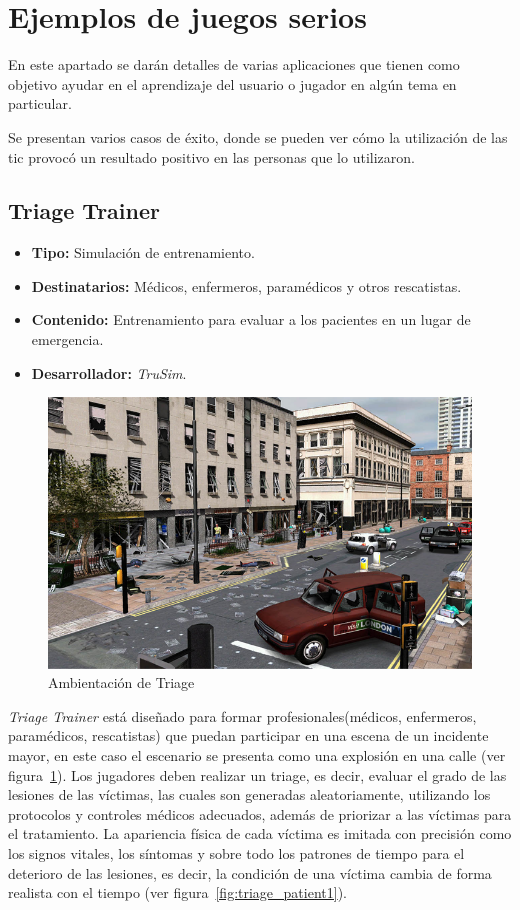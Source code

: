 \section{Ejemplos de juegos serios}

En este apartado se darán detalles de varias aplicaciones que
tienen como objetivo ayudar en el aprendizaje del usuario o jugador en algún
tema en particular.

Se presentan varios casos de éxito, donde se pueden ver cómo la utilización de
las \Gls{tic} provocó un resultado positivo en las personas que lo
utilizaron.

\subsection{Triage Trainer}

\begin{itemize}
\item \textbf{Tipo:} Simulación de entrenamiento.
\item \textbf{Destinatarios:} Médicos, enfermeros, paramédicos y otros
    rescatistas.
\item \textbf{Contenido:} Entrenamiento para evaluar a los pacientes en un lugar de
  emergencia.
\item \textbf{Desarrollador:} \emph{TruSim}.
\end{itemize}

\begin{figure}[ht!] 
\centering 
\includegraphics[scale=0.5]{tics/images/triage.png}
\caption{Ambientación de Triage}
\label{fig:triage}
\end{figure}

\emph{Triage Trainer} está diseñado para formar profesionales(médicos, enfermeros, 
paramédicos, rescatistas) que puedan participar en una escena de un incidente 
mayor, en este caso el escenario se presenta como una explosión en una calle 
(ver figura~\ref{fig:triage}). Los jugadores deben realizar un triage, es decir, evaluar 
el grado de las lesiones de las víctimas, las cuales son generadas aleatoriamente, 
utilizando los protocolos y controles médicos adecuados, además de priorizar a las 
víctimas para el tratamiento. La apariencia física de cada víctima es imitada con 
precisión como los signos vitales, los síntomas y sobre todo los patrones de tiempo 
para el deterioro de las lesiones, es decir, la condición de una víctima cambia de 
forma realista con el tiempo (ver figura~\ref{fig:triage_patient1}).

